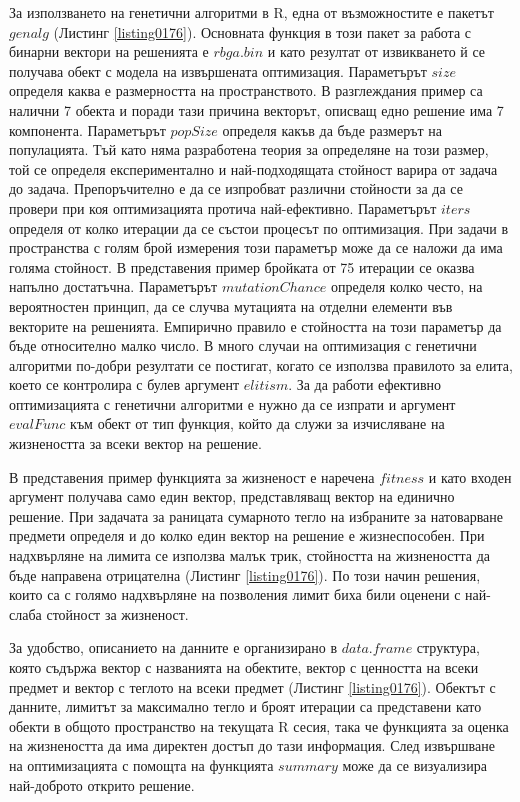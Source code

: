 За използването на генетични алгоритми в R, една от възможностите е пакетът $genalg$ (Листинг \ref{listing0176}). Основната функция в този пакет за работа с бинарни вектори на решенията е $rbga.bin$ и като резултат от извикването й се получава обект с модела на извършената оптимизация. Параметърът $size$ определя каква е размерността на пространството. В разглеждания пример са налични 7 обекта и поради тази причина векторът, описващ едно решение има 7 компонента. Параметърът $popSize$ определя какъв да бъде размерът на популацията. Тъй като няма разработена теория за определяне на този размер, той се определя експериментално и най-подходящата стойност варира от задача до задача. Препоръчително е да се изпробват различни стойности за да се провери при коя оптимизацията протича най-ефективно. Параметърът $iters$ определя от колко итерации да се състои процесът по оптимизация. При задачи в пространства с голям брой измерения този параметър може да се наложи да има голяма стойност. В представения пример бройката от 75 итерации се оказва напълно достатъчна. Параметърът $mutationChance$ определя колко често, на вероятностен принцип, да се случва мутацията на отделни елементи във векторите на решенията. Емпирично правило е стойността на този параметър да бъде относително малко число. В много случаи на оптимизация с генетични алгоритми по-добри резултати се постигат, когато се използва правилото за елита, което се контролира с булев аргумент $elitism$. За да работи ефективно оптимизацията с генетични алгоритми е нужно да се изпрати и аргумент $evalFunc$ към обект от тип функция, който да служи за изчисляване на жизнеността за всеки вектор на решение. 

В представения пример функцията за жизненост е наречена $fitness$ и като входен аргумент получава само един вектор, представляващ вектор на единично решение. При задачата за раницата сумарното тегло на избраните за натоварване предмети определя и до колко един вектор на решение е жизнеспособен. При надхвърляне на лимита се използва малък трик, стойността на жизнеността да бъде направена отрицателна (Листинг \ref{listing0176}). По този начин решения, които са с голямо надхвърляне на позволения лимит биха били оценени с най-слаба стойност за жизненост. 

За удобство, описанието на данните е организирано в $data.frame$ структура, която съдържа вектор с названията на обектите, вектор с ценността на всеки предмет и вектор с теглото на всеки предмет (Листинг \ref{listing0176}). Обектът с данните, лимитът за максимално тегло и броят итерации са представени като обекти в общото пространство на текущата R сесия, така че функцията за оценка на жизнеността да има директен достъп до тази информация. След извършване на оптимизацията с помощта на функцията $summary$ може да се визуализира най-доброто открито решение. 

